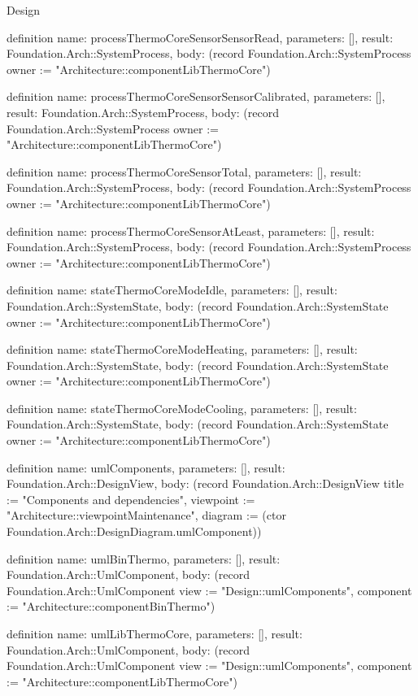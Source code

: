 \begin{lexlean}{Design}
\begin{semanticmodule}
definition{
  name: processThermoCoreSensorSensorRead,
  parameters: [],
  result: Foundation.Arch::SystemProcess,
  body: (record Foundation.Arch::SystemProcess {owner := "Architecture::componentLibThermoCore"})
}

definition{
  name: processThermoCoreSensorSensorCalibrated,
  parameters: [],
  result: Foundation.Arch::SystemProcess,
  body: (record Foundation.Arch::SystemProcess {owner := "Architecture::componentLibThermoCore"})
}

definition{
  name: processThermoCoreSensorTotal,
  parameters: [],
  result: Foundation.Arch::SystemProcess,
  body: (record Foundation.Arch::SystemProcess {owner := "Architecture::componentLibThermoCore"})
}

definition{
  name: processThermoCoreSensorAtLeast,
  parameters: [],
  result: Foundation.Arch::SystemProcess,
  body: (record Foundation.Arch::SystemProcess {owner := "Architecture::componentLibThermoCore"})
}

definition{
  name: stateThermoCoreModeIdle,
  parameters: [],
  result: Foundation.Arch::SystemState,
  body: (record Foundation.Arch::SystemState {owner := "Architecture::componentLibThermoCore"})
}

definition{
  name: stateThermoCoreModeHeating,
  parameters: [],
  result: Foundation.Arch::SystemState,
  body: (record Foundation.Arch::SystemState {owner := "Architecture::componentLibThermoCore"})
}

definition{
  name: stateThermoCoreModeCooling,
  parameters: [],
  result: Foundation.Arch::SystemState,
  body: (record Foundation.Arch::SystemState {owner := "Architecture::componentLibThermoCore"})
}

definition{
  name: umlComponents,
  parameters: [],
  result: Foundation.Arch::DesignView,
  body: (record Foundation.Arch::DesignView {title := "Components and dependencies", viewpoint := "Architecture::viewpointMaintenance", diagram := (ctor Foundation.Arch::DesignDiagram.umlComponent)})
}

definition{
  name: umlBinThermo,
  parameters: [],
  result: Foundation.Arch::UmlComponent,
  body: (record Foundation.Arch::UmlComponent {view := "Design::umlComponents", component := "Architecture::componentBinThermo"})
}

definition{
  name: umlLibThermoCore,
  parameters: [],
  result: Foundation.Arch::UmlComponent,
  body: (record Foundation.Arch::UmlComponent {view := "Design::umlComponents", component := "Architecture::componentLibThermoCore"})
}


\end{semanticmodule}
\end{lexlean}
